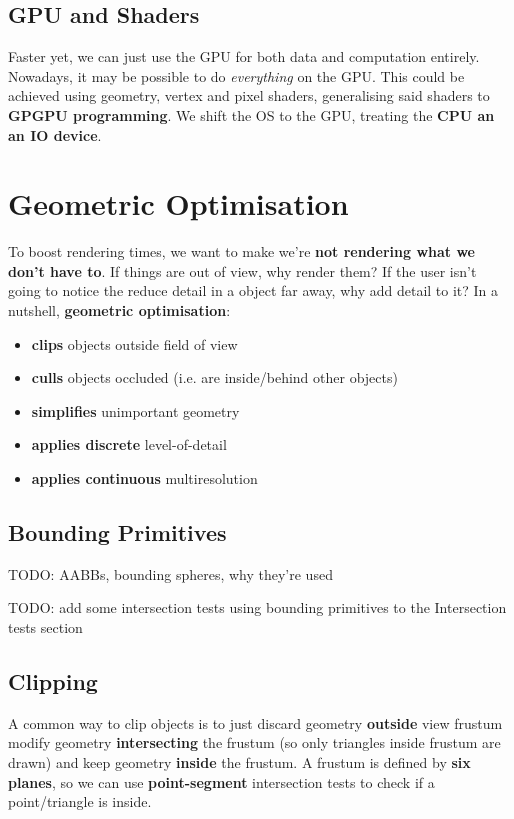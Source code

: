 \documentclass{article}
\begin{document}
\subsection{GPU and Shaders}

Faster yet, we can just use the GPU for both data and computation entirely. Nowadays, it may be possible to do \textit{everything} on the GPU. This could be achieved using geometry, vertex and pixel shaders, generalising said shaders to \textbf{GPGPU programming}. We shift the OS to the GPU, treating the \textbf{CPU an an IO device}.

\section{Geometric Optimisation}
\label{sec:geometric-optimisation}

To boost rendering times, we want to make we're \textbf{not rendering what we don't have to}. If things are out of view, why render them? If the user isn't going to notice the reduce detail in a object far away, why add detail to it? In a nutshell, \textbf{geometric optimisation}:
\begin{itemize}
	\item \textbf{clips} objects outside field of view
	\item \textbf{culls} objects occluded (i.e. are inside/behind other objects)
	\item \textbf{simplifies} unimportant geometry
	\item \textbf{applies discrete} level-of-detail
	\item \textbf{applies continuous} multiresolution
\end{itemize}

\subsection{Bounding Primitives}

TODO: AABBs, bounding spheres, why they're used

TODO: add some intersection tests using bounding primitives to the Intersection tests section

\subsection{Clipping}

A common way to clip objects is to just discard geometry \textbf{outside} view frustum modify geometry \textbf{intersecting} the frustum (so only triangles inside frustum are drawn) and keep geometry \textbf{inside} the frustum. A frustum is defined by \textbf{six planes}, so we can use \textbf{point-segment} intersection tests to check if a point/triangle is inside.
\end{document}
